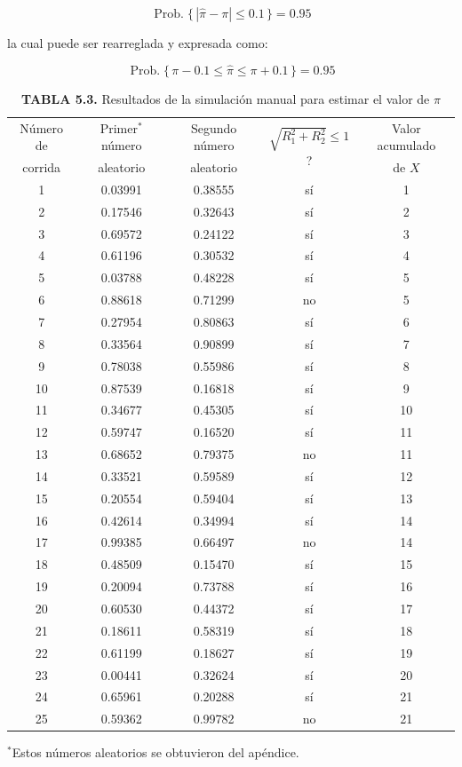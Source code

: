 \documentclass[11pt,letterpaper]{report}
\newcommand{\Prob}{\operatorname{Prob.}}
\begin{document}
\[
\Prob\{\,|\hat{\pi}-\pi| \le 0.1\,\}=0.95
\]

la cual puede ser rearreglada y expresada como:

\[
\Prob\{\,\pi-0.1 \le \hat{\pi} \le \pi+0.1\,\}=0.95
\]

\begin{table}[H]
\centering
\caption*{\textbf{TABLA 5.3.} Resultados de la simulación manual para estimar el valor de $\pi$}
\begin{tabular}{ccccc}
\toprule
Número de & Primer$^{*}$ número & Segundo número & \multirow{2}{*}{$\sqrt{R_1^{2}+R_2^{2}}\le 1$?} & Valor acumulado \\
corrida & aleatorio & aleatorio & & de $X$ \\
\midrule
1  & 0.03991 & 0.38555 & sí & 1  \\
2  & 0.17546 & 0.32643 & sí & 2  \\
3  & 0.69572 & 0.24122 & sí & 3  \\
4  & 0.61196 & 0.30532 & sí & 4  \\
5  & 0.03788 & 0.48228 & sí & 5  \\
6  & 0.88618 & 0.71299 & no & 5  \\
7  & 0.27954 & 0.80863 & sí & 6  \\
8  & 0.33564 & 0.90899 & sí & 7  \\
9  & 0.78038 & 0.55986 & sí & 8  \\
10 & 0.87539 & 0.16818 & sí & 9  \\
11 & 0.34677 & 0.45305 & sí & 10 \\
12 & 0.59747 & 0.16520 & sí & 11 \\
13 & 0.68652 & 0.79375 & no & 11 \\
14 & 0.33521 & 0.59589 & sí & 12 \\
15 & 0.20554 & 0.59404 & sí & 13 \\
16 & 0.42614 & 0.34994 & sí & 14 \\
17 & 0.99385 & 0.66497 & no & 14 \\
18 & 0.48509 & 0.15470 & sí & 15 \\
19 & 0.20094 & 0.73788 & sí & 16 \\
20 & 0.60530 & 0.44372 & sí & 17 \\
21 & 0.18611 & 0.58319 & sí & 18 \\
22 & 0.61199 & 0.18627 & sí & 19 \\
23 & 0.00441 & 0.32624 & sí & 20 \\
24 & 0.65961 & 0.20288 & sí & 21 \\
25 & 0.59362 & 0.99782 & no & 21 \\
\bottomrule
\end{tabular}

\vspace{2pt}
{\footnotesize $^{*}$Estos números aleatorios se obtuvieron del apéndice.}
\end{table}
\end{document}
